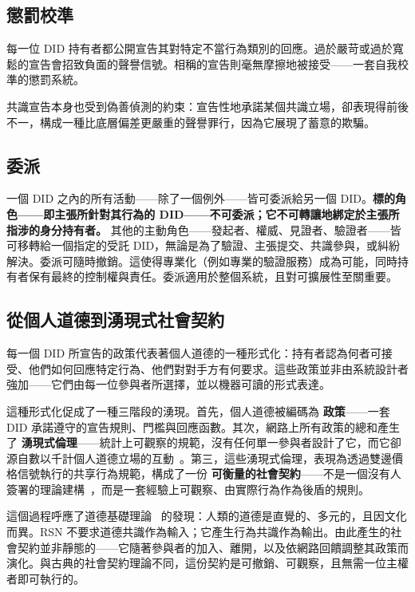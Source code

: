 \documentclass[11pt,a4paper,twocolumn]{article}
\begin{document}
\subsection{懲罰校準}

每一位 DID 持有者都公開宣告其對特定不當行為類別的回應。過於嚴苛或過於寬鬆的宣告會招致負面的聲譽信號。相稱的宣告則毫無摩擦地被接受——一套自我校準的懲罰系統。

共識宣告本身也受到偽善偵測的約束：宣告性地承諾某個共識立場，卻表現得前後不一，構成一種比底層偏差更嚴重的聲譽罪行，因為它展現了蓄意的欺騙。

\subsection{委派}

一個 DID 之內的所有活動——除了一個例外——皆可委派給另一個 DID。\textbf{標的角色——即主張所針對其行為的 DID——不可委派；它不可轉讓地綁定於主張所指涉的身分持有者。} 其他的主動角色——發起者、權威、見證者、驗證者——皆可移轉給一個指定的受託 DID，無論是為了驗證、主張提交、共識參與，或糾紛解決。委派可隨時撤銷。這使得專業化（例如專業的驗證服務）成為可能，同時持有者保有最終的控制權與責任。委派適用於整個系統，且對可擴展性至關重要。

\subsection{從個人道德到湧現式社會契約}

每一個 DID 所宣告的政策代表著個人道德的一種形式化：持有者認為何者可接受、他們如何回應特定行為、他們對對手方有何要求。這些政策並非由系統設計者強加——它們由每一位參與者所選擇，並以機器可讀的形式表達。

這種形式化促成了一種三階段的湧現。首先，個人道德被編碼為 \textbf{政策}——一套 DID 承諾遵守的宣告規則、門檻與回應函數。其次，網路上所有政策的總和產生了 \textbf{湧現式倫理}——統計上可觀察的規範，沒有任何單一參與者設計了它，而它卻源自數以千計個人道德立場的互動~\cite{durkheim1893}。第三，這些湧現式倫理，表現為透過雙邊價格信號執行的共享行為規範，構成了一份 \textbf{可衡量的社會契約}——不是一個沒有人簽署的理論建構~\cite{rawls1971}，而是一套經驗上可觀察、由實際行為作為後盾的規則。

這個過程呼應了道德基礎理論~\cite{haidt2012} 的發現：人類的道德是直覺的、多元的，且因文化而異。RSN 不要求道德共識作為輸入；它產生行為共識作為輸出。由此產生的社會契約並非靜態的——它隨著參與者的加入、離開，以及依網路回饋調整其政策而演化。與古典的社會契約理論不同，這份契約是可撤銷、可觀察，且無需一位主權者即可執行的。
\end{document}

